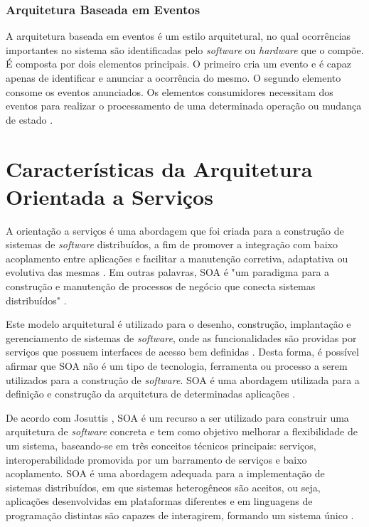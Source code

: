 \subsubsection{Arquitetura Baseada em Eventos}
A arquitetura baseada em eventos é um estilo arquitetural, no qual ocorrências importantes no sistema são identificadas pelo \textit{software} ou \textit{hardware} que o compõe. É composta por dois elementos principais. O primeiro cria um evento e é capaz apenas de identificar e anunciar a ocorrência do mesmo. O segundo elemento consome os eventos anunciados. Os elementos consumidores necessitam dos eventos para realizar o processamento de uma determinada operação ou mudança de estado \cite{rouse}.

\section{Características da Arquitetura Orientada a Serviços}
A orientação a serviços é uma abordagem que foi criada para a construção de sistemas de \textit{software} distribuídos, a fim de promover a integração com baixo acoplamento entre aplicações e facilitar a manutenção corretiva, adaptativa ou evolutiva das mesmas \cite{linthicum_soainrealworld_2007}. Em outras palavras, SOA é "um paradigma para a construção e manutenção de processos de negócio que conecta sistemas distribuídos" \cite{josuttis_soa_2007}.

Este modelo arquitetural é utilizado para o desenho, construção, implantação e gerenciamento de sistemas de \textit{software}, onde as funcionalidades são providas por serviços que possuem interfaces de acesso bem definidas \cite{lewis_getting_2010}. Desta forma, é possível afirmar que SOA não é um tipo de tecnologia, ferramenta ou processo a serem utilizados para a construção de \textit{software}. SOA é uma abordagem utilizada para a definição e construção da arquitetura de determinadas aplicações \cite{oliveira_interoperabilidade}.

De acordo com Josuttis \cite{josuttis_soa_2007}, SOA é um recurso a ser utilizado para construir uma arquitetura de \textit{software} concreta e tem como objetivo melhorar a flexibilidade de um sistema, baseando-se em três conceitos técnicos principais: serviços, interoperabilidade promovida por um barramento de serviços e baixo acoplamento. SOA é uma abordagem adequada para a implementação de sistemas distribuídos, em que sistemas heterogêneos são aceitos, ou seja, aplicações desenvolvidas em plataformas diferentes e em linguagens de programação distintas são capazes de interagirem, formando um sistema único \cite{josuttis_soa_2007}.

